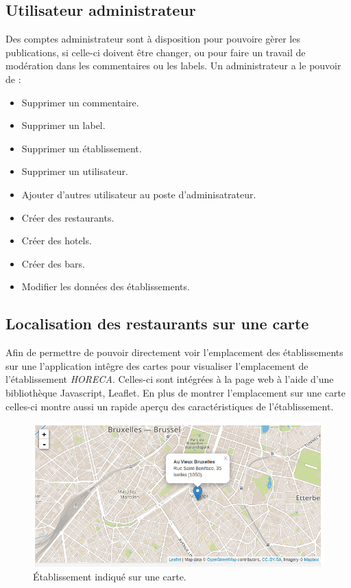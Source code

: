 \documentclass[a4paper,10pt]{article}
\begin{document}
\subsection{Utilisateur administrateur}
    Des comptes administrateur sont à disposition pour pouvoire gèrer les
    publications, si celle-ci doivent être changer, ou pour faire un travail de
    modération dans les commentaires ou les labels.
    Un administrateur a le pouvoir de :
    \begin{itemize}
        \item Supprimer un commentaire.
        \item Supprimer un label.
        \item Supprimer un établissement.
        \item Supprimer un utilisateur.
        \item Ajouter d'autres utilisateur au poste d'adminisatrateur.
        \item Créer des restaurants.
        \item Créer des hotels.
        \item Créer des bars.
        \item Modifier les données des établissements.
    \end{itemize}
\subsection{Localisation des restaurants sur une carte}
    Afin de permettre de pouvoir directement voir l'emplacement des
    établissements sur une l'application intêgre des cartes pour visualiser
    l'emplacement de l'établissement \emph{HORECA}. Celles-ci sont intégrées à
    la page web à l'aide d'une bibliothèque Javascript, Leaflet.
    En plus de montrer l'emplacement sur une carte celles-ci montre aussi un
    rapide aperçu des caractéristiques de l'établissement.

    \begin{figure}[h]
        \centering
        \includegraphics[scale=0.4]{./images/card.png}
        \caption{Établissement indiqué sur une carte.}
    \end{figure}
\end{document}

